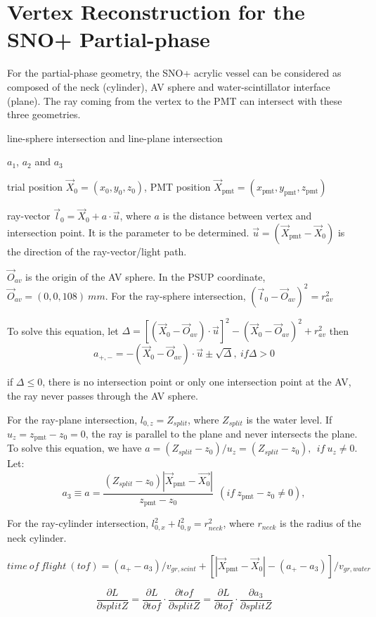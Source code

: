 \section{Vertex Reconstruction for the SNO+ Partial-phase}
For the partial-phase geometry, the SNO+ acrylic vessel can be considered as composed of the neck (cylinder), AV sphere and water-scintillator interface (plane). The ray coming from the vertex to the PMT can intersect with these three geometries.

line-sphere intersection and line-plane intersection

$a_1$, $a_2$ and $a_3$


trial position $\vec{X}_0=(x_0,y_0,z_0)$,  PMT position $\vec{X}_{\mathrm{pmt}}=(x_\mathrm{pmt},y_\mathrm{pmt},z_\mathrm{pmt})$


ray-vector $\vec{l}_0=\vec{X}_0+a\cdot \vec{u}$,
where $a$ is the distance between vertex and intersection point. It is the parameter to be determined.
$\vec{u}=(\vec{X}_{\mathrm{pmt}}-\vec{X}_0)$ is the direction of the ray-vector/light path.

$\vec{O}_{av}$ is the origin of the AV sphere. In the PSUP coordinate, $\vec{O}_{av} = (0,0,108)~mm$.
For the ray-sphere intersection,
$(\vec{l}_0-\vec{O}_{av})^2 = r^2_{av}$

To solve this equation, let $\Delta = {[(\vec{X}_0-\vec{O}_{av})\cdot\vec{u}]}^2-{(\vec{X}_0-\vec{O}_{av})}^2+r^2_{av}$
then
\[
a_{+,-} = -(\vec{X}_0-\vec{O}_{av})\cdot\vec{u}\pm\sqrt{\Delta},
~if \Delta>0\]

if $\Delta\leq0$,
there is no intersection point or only one intersection point at the AV, the ray never passes through the AV sphere.

For the ray-plane intersection, 
$l_{0,z} = Z_{split}$, where $Z_{split}$ is the water level.
If $u_z=z_\mathrm{pmt}-z_0=0$, the ray is parallel to the plane and never intersects the plane.
To solve this equation, we have $a=(Z_{split}-z_0)/u_z=(Z_{split}-z_0),~~if~u_z\neq 0$.
Let: 
\[
a_3 \equiv a = \frac{(Z_{split}-z_0)|\vec{X}_{\mathrm{pmt}}-\vec{X_0}|}{z_\mathrm{pmt}-z_0}~~(if ~z_\mathrm{pmt}-z_0\neq 0),
\]


For the ray-cylinder intersection,
$l^2_{0,x}+l^2_{0,y} = r^2_{neck}$, where $ r_{neck}$ is the radius of the neck cylinder.

\[time~of~flight~(tof)=
(a_+-a_3)/v_{gr,scint}+[|\vec{X}_{\mathrm{pmt}}-\vec{X}_0|-(a_+-a_3)]/v_{gr,water}
\]


\[
\frac{\partial L}{\partial splitZ} = \frac{\partial L}{\partial tof}\cdot\frac{\partial tof}{\partial splitZ}=\frac{\partial L}{\partial tof}\cdot\frac{\partial a_3}{\partial splitZ}
\]


